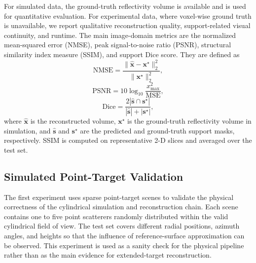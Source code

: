 \documentclass[journal]{IEEEtran}
\begin{document}
For simulated data, the ground-truth reflectivity volume is available and is used for quantitative evaluation. For experimental data, where voxel-wise ground truth is unavailable, we report qualitative reconstruction quality, support-related visual continuity, and runtime. The main image-domain metrics are the normalized mean-squared error (NMSE), peak signal-to-noise ratio (PSNR), structural similarity index measure (SSIM), and support Dice score. They are defined as
\begin{equation}
\mathrm{NMSE}=\frac{\|\hat{\mathbf{x}}-\mathbf{x}^{\star}\|_2^2}{\|\mathbf{x}^{\star}\|_2^2},
\label{eq:nmse}
\end{equation}
\begin{equation}
\mathrm{PSNR}=10\log_{10}\frac{x_{\max}^2}{\mathrm{MSE}},
\label{eq:psnr}
\end{equation}
\begin{equation}
\mathrm{Dice}=\frac{2|\hat{\mathbf{s}}\cap\mathbf{s}^{\star}|}{|\hat{\mathbf{s}}|+|\mathbf{s}^{\star}|},
\label{eq:dice_metric}
\end{equation}
where $\hat{\mathbf{x}}$ is the reconstructed volume, $\mathbf{x}^{\star}$ is the ground-truth reflectivity volume in simulation, and $\hat{\mathbf{s}}$ and $\mathbf{s}^{\star}$ are the predicted and ground-truth support masks, respectively. SSIM is computed on representative 2-D slices and averaged over the test set.


\subsection{Simulated Point-Target Validation}

\label{subsec:point_target_results}

The first experiment uses sparse point-target scenes to validate the physical correctness of the cylindrical simulation and reconstruction chain. Each scene contains one to five point scatterers randomly distributed within the valid cylindrical field of view. The test set covers different radial positions, azimuth angles, and heights so that the influence of reference-surface approximation can be observed. This experiment is used as a sanity check for the physical pipeline rather than as the main evidence for extended-target reconstruction.
\end{document}
